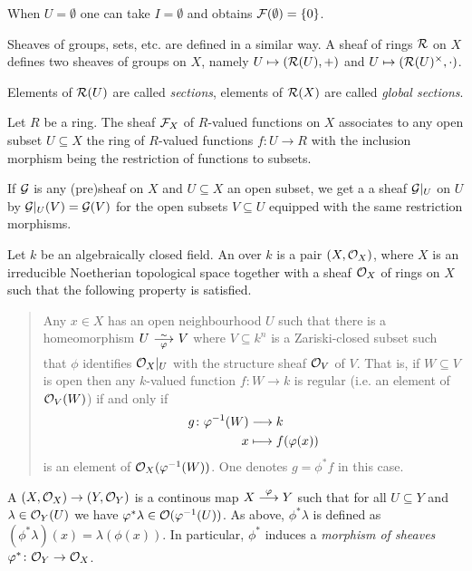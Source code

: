 \documentclass[a4paper,parskip=half,numbers=enddot, DIV=12]{scrreprt}
\begin{document}
\begin{rem}
    When $U=\emptyset$ one can take $I=\emptyset$ and obtains $\mathcal{F}(\emptyset) = \{0\}$.
\end{rem}
\begin{rem}
    Sheaves of groups, sets, etc. are defined in a similar way. A sheaf of rings $\mathcal{R}$ on $X$ defines two sheaves of groups on $X$, namely $U\mapsto (\mathcal{R}(U), +)$ and $U\mapsto (\mathcal{R}(U)^\times, \cdot)$.
\end{rem}
\begin{rem}
    Elements of $\mathcal{R}(U)$ are called \emph{sections}, elements of $\mathcal{R}(X)$ are called \emph{global sections}.
\end{rem}
\begin{example}
	    Let $R$ be a ring. The sheaf $\mathcal{F}_X$ of $R$-valued functions on $X$ associates to any open subset $U\subseteq X$ the ring of $R$-valued functions $f\colon U \to R$ with the inclusion morphism being the restriction of functions to subsets.
\end{example}
\begin{rem*}
	  If $\mathcal{G}$ is any (pre)sheaf on $X$ and $U\subseteq X$ an open subset, we get a a sheaf $\mathcal{G}|_U$ on $U$ by $\mathcal{G}|_U(V) = \mathcal{G}(V)$ for the open subsets $V\subseteq U$ equipped with the same restriction morphisms.
\end{rem*}
\begin{defi} 
	    Let $k$ be an algebraically closed field. An  over $k$ is a pair $(X,\mathcal{O}_X)$, where $X$ is an irreducible Noetherian topological space together with a sheaf $\mathcal{O}_X$ of rings on $X$ such that the following property is satisfied.
	    \begin{quote}
	        Any $x\in X$ has an open neighbourhood $U$ such that there is a homeomorphism $U\isomorphism[\phi] V$ where $V\subseteq k^n$ is a Zariski-closed subset such that $\phi$ identifies $\mathcal{O}_X|_U$ with the structure sheaf $\mathcal{O}_V$ of $V$. That is, if $W \subseteq V$ is open then any $k$-valued function $f\colon W\to k$ is regular (i.e. an element of $\mathcal{O}_V(W)$) if and only if 
	        \begin{align*}
	            g\colon \varphi^{-1}(W) &\longrightarrow k\\
	            x&\longmapsto f(\varphi(x))
	        \end{align*}
	        is an element of $\mathcal{O}_X(\varphi^{-1}(W))$. One denotes $g=\phi^*f$ in this case.
	    \end{quote}
	    A  $(X,\mathcal{O}_X) \to (Y,\mathcal{O}_Y)$ is a continous map $X\morphism[\phi] Y$ such that for all $U\subseteq Y$ and $\lambda \in \mathcal{O}_Y(U)$ we have $\varphi^\ast \lambda \in \mathcal{O}(\varphi^{-1}(U))$. As above, $\phi^\ast\lambda$ is defined as $(\phi^\ast\lambda)(x) = \lambda(\phi(x))$. In particular, $\phi^*$ induces a \emph{morphism of sheaves} $\varphi^*\colon \mathcal{O}_Y\to\mathcal{O}_X$.
	\end{defi}
\end{document}
